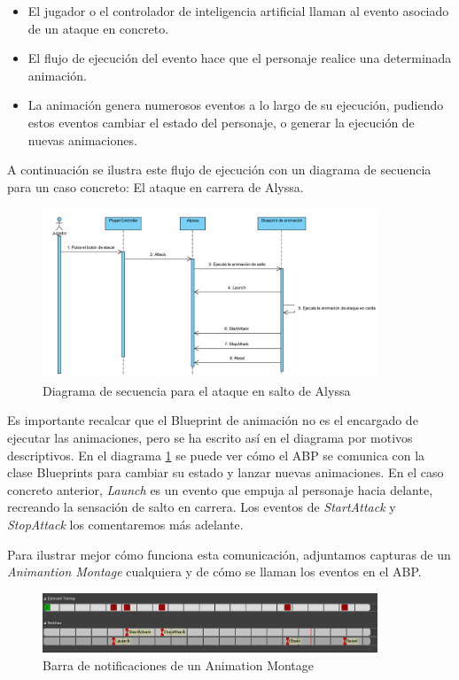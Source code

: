 \begin{itemize}
\item[1] El jugador o el controlador de inteligencia artificial llaman al evento asociado de un ataque en concreto.
\item[2] El flujo de ejecución del evento hace que el personaje realice una determinada animación.
\item[3] La animación genera numerosos eventos a lo largo de su ejecución, pudiendo estos eventos cambiar el estado del personaje, o generar la ejecución de nuevas animaciones.
\end{itemize}


A continuación se ilustra este flujo de ejecución con un diagrama de secuencia para un caso concreto: El ataque en carrera de Alyssa.


\begin{figure}[H]
  \centering
  \includegraphics[width=10cm]{./images/Secuencia_Alyssa.png}
  \caption{Diagrama de secuencia para el ataque en salto de Alyssa}
  \label{AlyssaS}
\end{figure}


Es importante recalcar que el Blueprint de animación no es el encargado de ejecutar las animaciones, pero se ha escrito así en el diagrama por motivos descriptivos. En el diagrama \ref{AlyssaS} se puede ver cómo el \ac{ABP} se comunica con la clase Blueprints para cambiar su estado y lanzar nuevas animaciones. En el caso concreto anterior, \textit{Launch} es un evento que empuja al personaje hacia delante, recreando la sensación de salto en carrera. Los eventos de \textit{StartAttack} y \textit{StopAttack} los comentaremos más adelante.


Para ilustrar mejor cómo funciona esta comunicación, adjuntamos capturas de un \textit{Animantion Montage} cualquiera y de cómo se llaman los eventos en el \ac{ABP}.

\begin{figure}[H]
  \centering
  \includegraphics[width=10cm]{./images/Notifs_Montage.png}
  \caption{Barra de notificaciones de un Animation Montage}
  \label{AlyssaM}
\end{figure}


